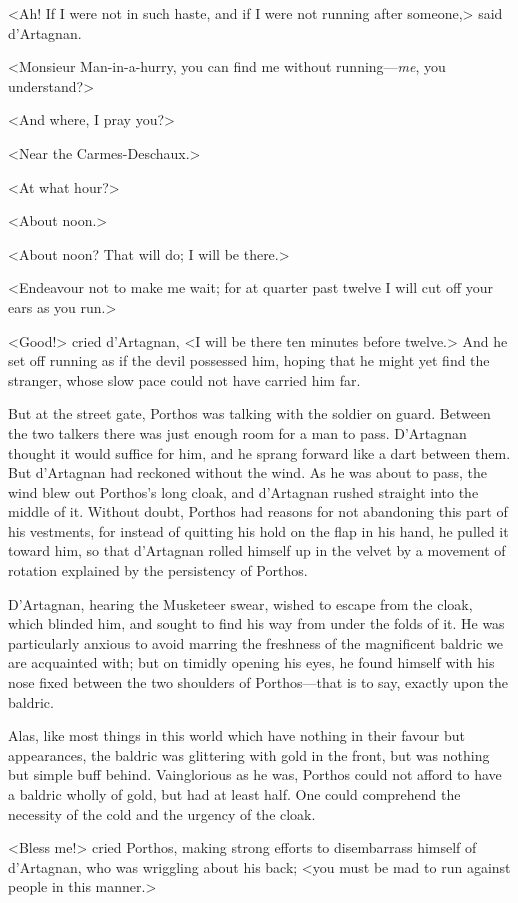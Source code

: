 <Ah! If I were not in such haste, and if I were not running after someone,> said d'Artagnan. 

<Monsieur Man-in-a-hurry, you can find me without running---\textit{me}, you understand?> 

<And where, I pray you?> 

<Near the Carmes-Deschaux.> 

<At what hour?> 

<About noon.> 

<About noon? That will do; I will be there.> 

<Endeavour not to make me wait; for at quarter past twelve I will cut off your ears as you run.> 

<Good!> cried d'Artagnan, <I will be there ten minutes before twelve.> And he set off running as if the devil possessed him, hoping that he might yet find the stranger, whose slow pace could not have carried him far. 

But at the street gate, Porthos was talking with the soldier on guard. Between the two talkers there was just enough room for a man to pass. D'Artagnan thought it would suffice for him, and he sprang forward like a dart between them. But d'Artagnan had reckoned without the wind. As he was about to pass, the wind blew out Porthos's long cloak, and d'Artagnan rushed straight into the middle of it. Without doubt, Porthos had reasons for not abandoning this part of his vestments, for instead of quitting his hold on the flap in his hand, he pulled it toward him, so that d'Artagnan rolled himself up in the velvet by a movement of rotation explained by the persistency of Porthos. 

D'Artagnan, hearing the Musketeer swear, wished to escape from the cloak, which blinded him, and sought to find his way from under the folds of it. He was particularly anxious to avoid marring the freshness of the magnificent baldric we are acquainted with; but on timidly opening his eyes, he found himself with his nose fixed between the two shoulders of Porthos---that is to say, exactly upon the baldric. 

Alas, like most things in this world which have nothing in their favour but appearances, the baldric was glittering with gold in the front, but was nothing but simple buff behind. Vainglorious as he was, Porthos could not afford to have a baldric wholly of gold, but had at least half. One could comprehend the necessity of the cold and the urgency of the cloak. 

<Bless me!> cried Porthos, making strong efforts to disembarrass himself of d'Artagnan, who was wriggling about his back; <you must be mad to run against people in this manner.> 

